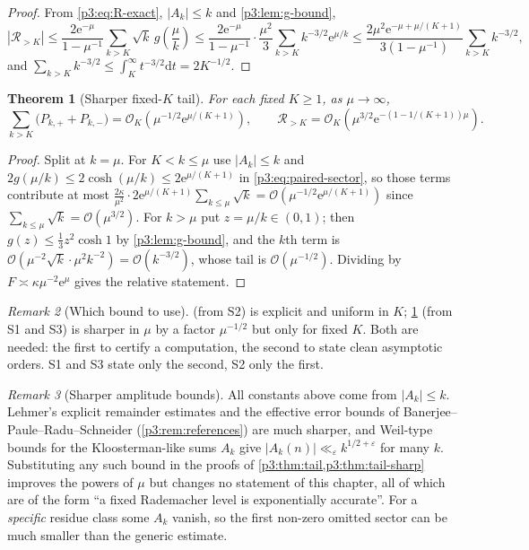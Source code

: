 \documentclass[11pt,a4paper,oneside]{book}
\theoremstyle{plain}
\newtheorem{theorem}{Theorem}[chapter]
\theoremstyle{definition}
\theoremstyle{remark}
\newtheorem{remark}[theorem]{Remark}
\newcommand{\e}{\mathrm{e}}
\newcommand{\dd}{\mathrm{d}}
\newcommand{\bigO}{\mathcal{O}}
\begin{document}
\begin{proof}
From \cref{p3:eq:R-exact}, $|A_{k}|\le k$ and \cref{p3:lem:g-bound},
\[
|\mathcal{R}_{>K}| \le\frac{2\e^{-\mu}}{1-\mu^{-1}}\sum_{k>K}\sqrt k\,g\!\left(\frac\mu k\right)
\le\frac{2\e^{-\mu}}{1-\mu^{-1}}\cdot\frac{\mu^{2}}{3} \sum_{k>K}k^{-3/2}\e^{\mu/k}
\le\frac{2\mu^{2}\e^{-\mu+\mu/(K+1)}}{3(1-\mu^{-1})}\sum_{k>K}k^{-3/2},
\]
and $\sum_{k>K}k^{-3/2}\le\int_{K}^{\infty}t^{-3/2}\dd t=2K^{-1/2}$.
\end{proof}

\begin{theorem}[Sharper fixed-$K$ tail]\label{p3:thm:tail-sharp}
For each fixed $K\ge1$, as $\mu\to\infty$,
\begin{equation}\label{p3:eq:tail-sharp}
 \sum_{k>K}\bigl(P_{k,+}+P_{k,-}\bigr)
 =\bigO_{K}\!\left(\mu^{-1/2}\e^{\mu/(K+1)}\right),
 \qquad
 \mathcal{R}_{>K}=\bigO_{K}\!\left(\mu^{3/2}\e^{-(1-1/(K+1))\mu}\right).
\end{equation}
\end{theorem}

\begin{proof}
Split at $k=\mu$. For $K<k\le\mu$ use $|A_{k}|\le k$ and
$2g(\mu/k)\le2\cosh(\mu/k)\le2\e^{\mu/(K+1)}$ in \cref{p3:eq:paired-sector}, so those terms
contribute at most $\frac{2\kappa}{\mu^{2}}\cdot2\e^{\mu/(K+1)}\sum_{k\le\mu}\sqrt k
=\bigO(\mu^{-1/2}\e^{\mu/(K+1)})$ since $\sum_{k\le\mu}\sqrt k=\bigO(\mu^{3/2})$. For
$k>\mu$ put $z=\mu/k\in(0,1)$; then $g(z)\le\tfrac13z^{2}\cosh1$ by \cref{p3:lem:g-bound}, and the
$k$th term is $\bigO(\mu^{-2}\sqrt k\cdot\mu^{2}k^{-2})=\bigO(k^{-3/2})$, whose tail is
$\bigO(\mu^{-1/2})$. Dividing by $F\asymp\kappa\mu^{-2}\e^{\mu}$ gives the relative
statement.
\end{proof}

\begin{remark}[Which bound to use]
 (from S2) is explicit and uniform in $K$; \cref{p3:thm:tail-sharp} (from S1 and
S3) is sharper in $\mu$ by a factor $\mu^{-1/2}$ but only for fixed $K$. Both are needed: the
first to certify a computation, the second to state clean asymptotic orders. S1 and S3 state only
the second, S2 only the first.
\end{remark}

\begin{remark}[Sharper amplitude bounds]\label{p3:rem:sharper-bounds}
All constants above come from $|A_{k}|\le k$. Lehmer's explicit remainder estimates and the
effective error bounds of Banerjee--Paule--Radu--Schneider (\cref{p3:rem:references}) are much
sharper, and Weil-type bounds for the Kloosterman-like sums $A_{k}$ give
$|A_{k}(n)|\ll_{\varepsilon}k^{1/2+\varepsilon}$ for many $k$. Substituting any such bound in the
proofs of \cref{p3:thm:tail,p3:thm:tail-sharp} improves the powers of $\mu$ but changes no
statement of this chapter, all of which are of the form ``a fixed Rademacher level is
exponentially accurate''. For a \emph{specific} residue class some $A_{k}$ vanish, so the first
non-zero omitted sector can be much smaller than the generic estimate.
\end{remark}
\end{document}
